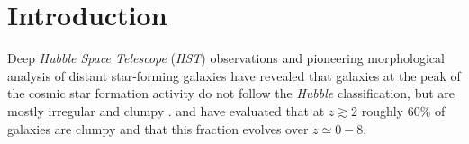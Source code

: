 \documentclass[twocolumn]{aastex61}
\begin{document}



%

\section{Introduction}
\label{sect:introduction}

Deep {\it Hubble Space Telescope} ({\it HST}) observations and pioneering 
morphological analysis of distant star-forming galaxies have revealed that 
galaxies at the peak of the cosmic star formation activity do not follow the 
{\it Hubble} classification, but are mostly irregular and clumpy 
\citep{elmegreen05,elmegreen07,elmegreen09}. \citet{guo15} and \citet{shibuya16} 
have evaluated that at $z\gtrsim 2$ roughly 60\% of galaxies are clumpy and that 
this fraction evolves over $z\simeq 0-8$.
\end{document}
